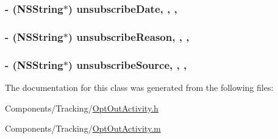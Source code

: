 \hypertarget{interface_opt_out_activity_ab9f169b83638060f87143133f7afb60c}{
\subsubsection[{unsubscribe\-Date}]{\setlength{\rightskip}{0pt plus 5cm}-\/ (N\-S\-String$\ast$) unsubscribe\-Date\hspace{0.3cm}{\ttfamily [read]}, {\ttfamily [write]}, {\ttfamily [nonatomic]}, {\ttfamily [strong]}}}\label{interface_opt_out_activity_ab9f169b83638060f87143133f7afb60c}
\hypertarget{interface_opt_out_activity_aa4bb9add818d2fdcc90f612d89ffde4b}{
\subsubsection[{unsubscribe\-Reason}]{\setlength{\rightskip}{0pt plus 5cm}-\/ (N\-S\-String$\ast$) unsubscribe\-Reason\hspace{0.3cm}{\ttfamily [read]}, {\ttfamily [write]}, {\ttfamily [nonatomic]}, {\ttfamily [strong]}}}\label{interface_opt_out_activity_aa4bb9add818d2fdcc90f612d89ffde4b}
\hypertarget{interface_opt_out_activity_a60f8ddc41707b7b60ec473e344d0caf7}{
\subsubsection[{unsubscribe\-Source}]{\setlength{\rightskip}{0pt plus 5cm}-\/ (N\-S\-String$\ast$) unsubscribe\-Source\hspace{0.3cm}{\ttfamily [read]}, {\ttfamily [write]}, {\ttfamily [nonatomic]}, {\ttfamily [strong]}}}\label{interface_opt_out_activity_a60f8ddc41707b7b60ec473e344d0caf7}


The documentation for this class was generated from the following files\-:\begin{DoxyCompactItemize}
\item 
Components/\-Tracking/\hyperlink{_opt_out_activity_8h}{Opt\-Out\-Activity.\-h}\item 
Components/\-Tracking/\hyperlink{_opt_out_activity_8m}{Opt\-Out\-Activity.\-m}\end{DoxyCompactItemize}

